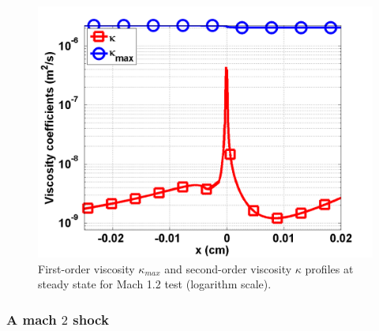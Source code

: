\begin{figure}[H]
                \centering
                \includegraphics[width=\textwidth]{figures/Mach_1p2_nel_1000_viscosity.png}
        \caption{First-order viscosity $\kappa_{max}$ and second-order viscosity $\kappa$ profiles at steady state for Mach 1.2 test (logarithm scale).}\label{fig:Mach12_viscosity}
\end{figure}

\subsubsection{A mach $2$ shock}

